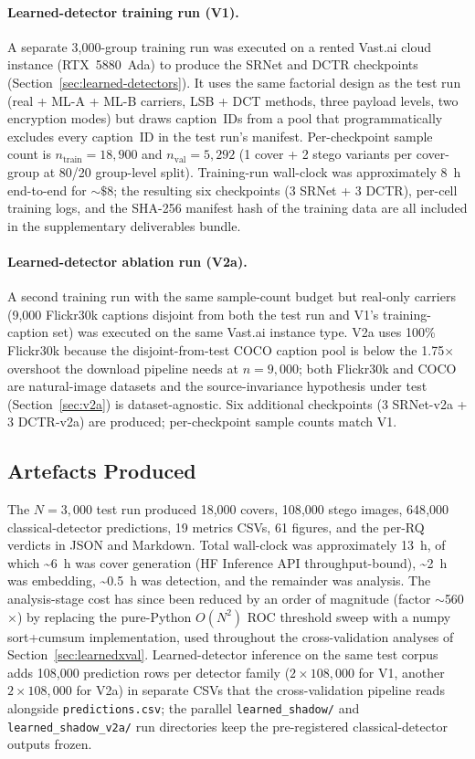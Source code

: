 \documentclass[10pt,twocolumn,a4paper]{article}
\begin{document}
\paragraph{Learned-detector training run (V1).} A separate 3{,}000-group training run was executed on a rented Vast.ai cloud instance (RTX~5880~Ada) to produce the SRNet and DCTR checkpoints (Section~\ref{sec:learned-detectors}). It uses the same factorial design as the test run (real + ML-A + ML-B carriers, LSB + DCT methods, three payload levels, two encryption modes) but draws caption~IDs from a pool that programmatically excludes every caption~ID in the test run's manifest. Per-checkpoint sample count is $n_\text{train}\!=\!18{,}900$ and $n_\text{val}\!=\!5{,}292$ (1 cover + 2 stego variants per cover-group at 80/20 group-level split). Training-run wall-clock was approximately 8~h end-to-end for $\sim\$$8; the resulting six checkpoints (3 SRNet + 3 DCTR), per-cell training logs, and the SHA-256 manifest hash of the training data are all included in the supplementary deliverables bundle.

\paragraph{Learned-detector ablation run (V2a).} A second training run with the same sample-count budget but real-only carriers (9{,}000 Flickr30k captions disjoint from both the test run and V1's training-caption set) was executed on the same Vast.ai instance type. V2a uses 100\% Flickr30k because the disjoint-from-test COCO caption pool is below the 1.75$\times$ overshoot the download pipeline needs at $n\!=\!9{,}000$; both Flickr30k and COCO are natural-image datasets and the source-invariance hypothesis under test (Section~\ref{sec:v2a}) is dataset-agnostic. Six additional checkpoints (3 SRNet-v2a + 3 DCTR-v2a) are produced; per-checkpoint sample counts match V1.

\subsection{Artefacts Produced}
The $N\!=\!3{,}000$ test run produced 18{,}000 covers, 108{,}000 stego images, 648{,}000 classical-detector predictions, 19 metrics CSVs, 61 figures, and the per-RQ verdicts in JSON and Markdown. Total wall-clock was approximately 13~h, of which \textasciitilde6~h was cover generation (HF Inference API throughput-bound), \textasciitilde2~h was embedding, \textasciitilde0.5~h was detection, and the remainder was analysis. The analysis-stage cost has since been reduced by an order of magnitude (factor $\sim$560$\times$) by replacing the pure-Python $O(N^2)$ ROC threshold sweep with a numpy sort+cumsum implementation, used throughout the cross-validation analyses of Section~\ref{sec:learnedxval}. Learned-detector inference on the same test corpus adds 108{,}000 prediction rows per detector family ($2\times108{,}000$ for V1, another $2\times108{,}000$ for V2a) in separate CSVs that the cross-validation pipeline reads alongside \texttt{predictions.csv}; the parallel \texttt{learned\_shadow/} and \texttt{learned\_shadow\_v2a/} run directories keep the pre-registered classical-detector outputs frozen.
\end{document}
